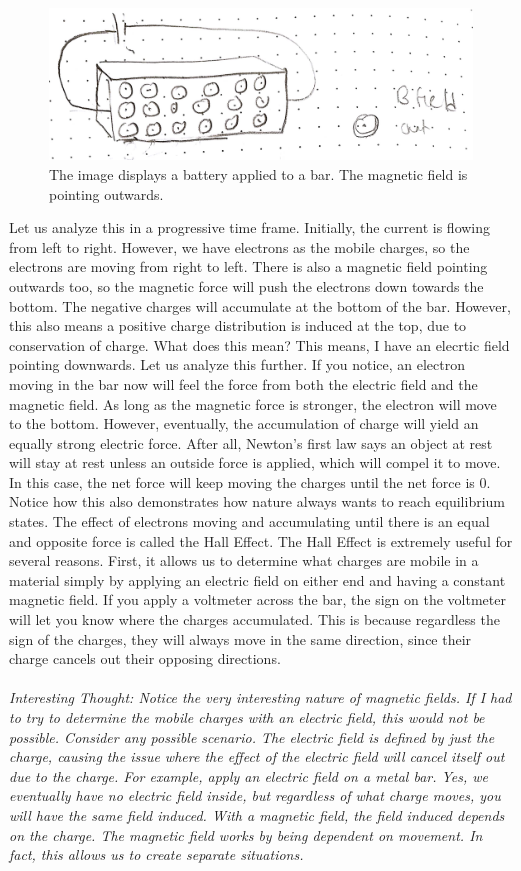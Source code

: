\documentclass{article}
\begin{document}
\pagebreak
\begin{figure}[ht]
\center
\includegraphics[width=.3\textwidth]{images/Week3pic3.jpg}
\caption{The image displays a battery applied to a bar. The magnetic field is pointing outwards.}
\end{figure}

Let us analyze this in a progressive time frame. Initially, the current is flowing from left to right. However, we have electrons as the mobile charges, so the electrons are moving from right to left. There is also a magnetic field pointing outwards too, so the magnetic force will push the electrons down towards the bottom. The negative charges will accumulate at the bottom of the bar. However, this also means a positive charge distribution is induced at the top, due to conservation of charge. What does this mean? This means, I have an elecrtic field pointing downwards. Let us analyze this further. If you notice, an electron moving in the bar now will feel the force from both the electric field and the magnetic field. As long as the magnetic force is stronger, the electron will move to the bottom. However, eventually, the accumulation of charge will yield an equally strong electric force. After all, Newton's first law says an object at rest will stay at rest unless an outside force is applied, which will compel it to move. In this case, the net force will keep moving the charges until the net force is $0$. Notice how this also demonstrates how nature always wants to reach equilibrium states. The effect of electrons moving and accumulating until there is an equal and opposite force is called the Hall Effect. The Hall Effect is extremely useful for several reasons. First, it allows us to determine what charges are mobile in a material simply by applying an electric field on either end and having a constant magnetic field. If you apply a voltmeter across the bar, the sign on the voltmeter will let you know where the charges accumulated. This is because regardless the sign of the charges, they will always move in the same direction, since their charge cancels out their opposing directions. \\
\\
\textit{Interesting Thought: Notice the very interesting nature of magnetic fields. If I had to try to determine the mobile charges with an electric field, this would not be possible. Consider any possible scenario. The electric field is defined by just the charge, causing the issue where the effect of the electric field will cancel itself out due to the charge. For example, apply an electric field on a metal bar. Yes, we eventually have no electric field inside, but regardless of what charge moves, you will have the same field induced. With a magnetic field, the field induced depends on the charge. The magnetic field works by being dependent on movement. In fact, this allows us to create separate situations.}\\
\end{document}
